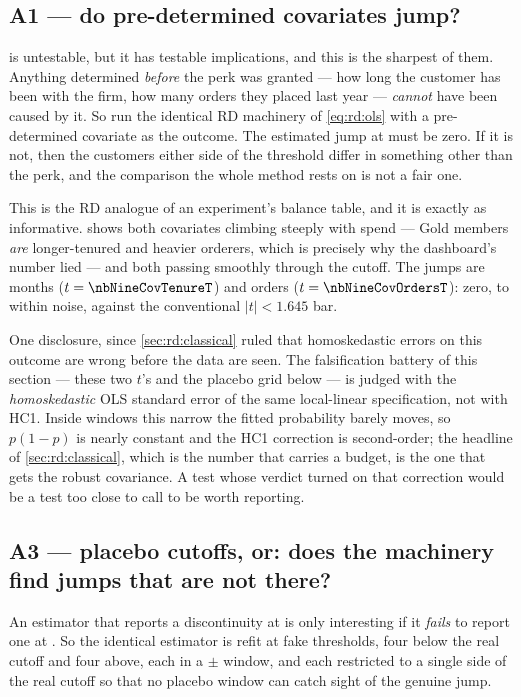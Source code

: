 \subsection*{A1 --- do pre-determined covariates jump?}

 is untestable, but it has testable implications, and this is the sharpest of them.
Anything determined \emph{before} the perk was granted --- how long the customer has been with the
firm, how many orders they placed last year --- \emph{cannot} have been caused by it. So run the
identical RD machinery of \cref{eq:rd:ols} with a pre-determined covariate as the outcome. The
estimated jump at \eur{\nbNineCutoff} must be zero. If it is not, then the customers either side of
the threshold differ in something other than the perk, and the comparison the whole method rests on
is not a fair one.

This is the RD analogue of an experiment's balance table, and it is exactly as informative.
 shows both covariates climbing steeply with spend --- Gold members
\emph{are} longer-tenured and heavier orderers, which is precisely why the dashboard's number lied
--- and both passing smoothly through the cutoff. The jumps are \nbNineCovTenure{} months
($t = \nbNineCovTenureT$) and \nbNineCovOrders{} orders ($t = \nbNineCovOrdersT$): zero, to within
noise, against the conventional $|t| < 1.645$ bar.

One disclosure, since \cref{sec:rd:classical} ruled that homoskedastic errors on this outcome are
wrong before the data are seen. The falsification battery of this section --- these two $t$'s and
the placebo grid below --- is judged with the \emph{homoskedastic} OLS standard error of the same
local-linear specification, not with HC1. Inside windows this narrow the fitted probability barely
moves, so $p(1-p)$ is nearly constant and the HC1 correction is second-order; the headline of
\cref{sec:rd:classical}, which is the number that carries a budget, is the one that gets the robust
covariance. A test whose verdict turned on that correction would be a test too close to call to be
worth reporting.



\subsection*{A3 --- placebo cutoffs, or: does the machinery find jumps that are not there?}

An estimator that reports a discontinuity at \eur{\nbNineCutoff} is only interesting if it
\emph{fails} to report one at . So the identical estimator is refit at \nbNinePlaceboN{}
fake thresholds, four below the real cutoff and four above, each in a $\pm$\eur{\nbNinePlaceboBw}
window, and each restricted to a single side of the real cutoff so that no placebo window can catch
sight of the genuine jump.

